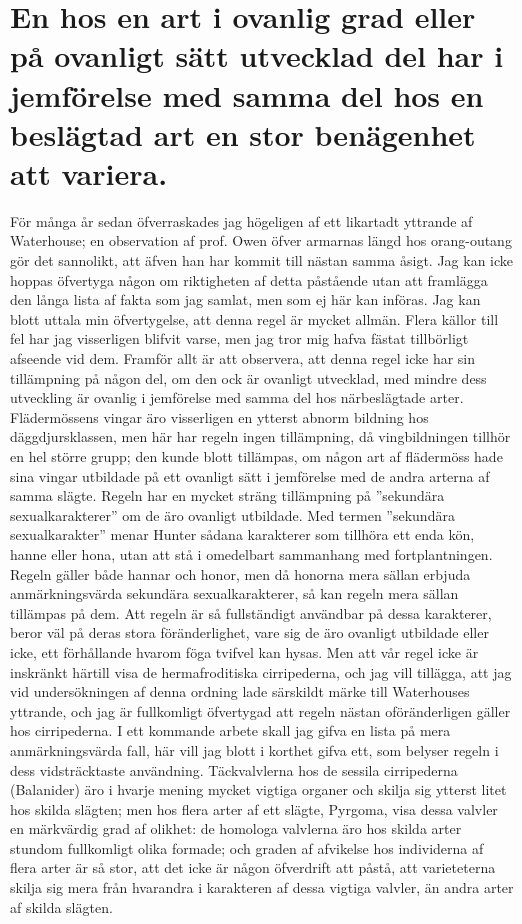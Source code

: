 \section[Variation i ovanliga grader]{En hos en art i ovanlig grad eller på ovanligt sätt
utvecklad del har i jemförelse med samma del
hos en beslägtad art en stor benägenhet att
variera.}

För många år sedan öfverraskades jag högeligen af ett likartadt yttrande af Waterhouse; en observation af prof. Owen öfver armarnas längd hos orang-outang gör det sannolikt, att äfven han har kommit till nästan samma åsigt. Jag kan icke hoppas öfvertyga någon om riktigheten af detta påstående utan att framlägga den långa lista af fakta som jag samlat, men som ej här kan införas. Jag kan blott uttala min öfvertygelse, att denna regel är mycket allmän. Flera källor till fel har jag visserligen blifvit varse, men jag tror mig hafva fästat tillbörligt afseende vid dem. Framför allt är att observera, att denna regel icke har sin tillämpning på någon del, om den ock är ovanligt utvecklad, med mindre dess utveckling är ovanlig i jemförelse med samma del hos närbeslägtade arter. Flädermössens vingar äro visserligen en ytterst abnorm bildning hos däggdjursklassen, men här har regeln ingen tillämpning, då vingbildningen tillhör en hel större grupp; den kunde blott tillämpas, om någon art af flädermöss hade sina vingar utbildade på ett ovanligt sätt i jemförelse med de andra arterna af samma slägte. Regeln har en mycket sträng tillämpning på ”sekundära sexualkarakterer” om de äro ovanligt utbildade. Med termen ”sekundära sexualkarakter” menar Hunter sådana karakterer som tillhöra ett enda kön, hanne eller hona, utan att stå i omedelbart sammanhang med fortplantningen. Regeln gäller både hannar och honor, men då honorna mera sällan erbjuda anmärkningsvärda sekundära sexualkarakterer, så kan regeln mera sällan tillämpas på dem. Att regeln är så fullständigt användbar på dessa karakterer, beror väl på deras stora föränderlighet, vare sig de äro ovanligt utbildade eller icke, ett förhållande hvarom föga tvifvel kan hysas. Men att vår regel icke är inskränkt härtill visa de hermafroditiska cirripederna, och jag vill tillägga, att jag vid undersökningen af denna ordning lade särskildt märke till Waterhouses yttrande, och jag är fullkomligt öfvertygad att regeln nästan oföränderligen gäller hos cirripederna. I ett kommande arbete skall jag gifva en lista på mera anmärkningsvärda fall, här vill jag blott i korthet gifva ett, som belyser regeln i dess vidsträcktaste användning. Täckvalvlerna hos de sessila cirripederna (Balanider) äro i hvarje mening mycket vigtiga organer och skilja sig ytterst litet hos skilda slägten; men hos flera arter af ett slägte, Pyrgoma, visa dessa valvler en märkvärdig grad af olikhet: de homologa valvlerna äro hos skilda arter stundom fullkomligt olika formade; och graden af afvikelse hos individerna af flera arter är så stor, att det icke är någon öfverdrift att påstå, att varieteterna skilja sig mera från hvarandra i karakteren af dessa vigtiga valvler, än andra arter af skilda slägten.

